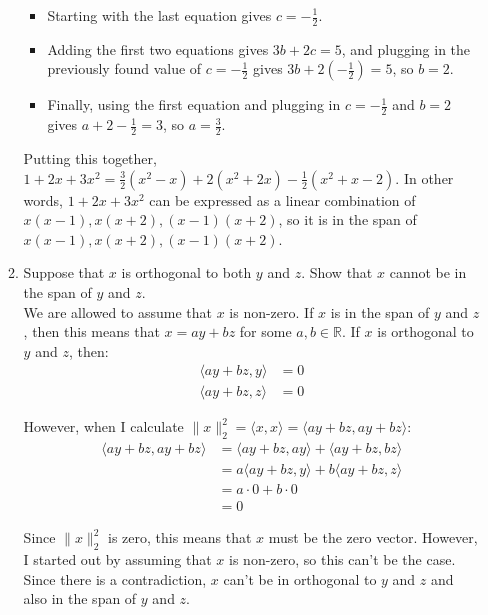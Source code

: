 \documentclass[11pt]{amsart}
\theoremstyle{plain}
\theoremstyle{definition}
\begin{document}
\begin{enumerate}
\begin{enumerate}
\begin{itemize}
	\item Starting with the last equation gives $c = -\frac{1}{2}$.
	\item Adding the first two equations gives $3b + 2c = 5$, and plugging in the previously found value of $c = -\frac{1}{2}$ gives $3b + 2(-\frac{1}{2}) = 5$, so $b = 2$.
	\item Finally, using the first equation and plugging in $c = -\frac{1}{2}$ and $b = 2$ gives $a + 2 - \frac{1}{2} = 3$, so $a = \frac{3}{2}$. 
\end{itemize}
  Putting this together, $1 + 2x + 3x^2 = \frac{3}{2}(x^2 - x) + 2(x^2 + 2x) - \frac{1}{2}(x^2 + x -2)$. In other words, $1 + 2x + 3x^2$ can be expressed as a linear combination of $x(x-1), x(x+2), (x-1)(x+2)$, so it is in the span of $x(x-1), x(x+2), (x-1)(x+2)$. 

\bigskip
\item Suppose that $x$ is orthogonal to both $y$ and $z$. 
Show that $x$ cannot be in the span of $y$ and $z$. \\

We are allowed to assume that $x$ is non-zero. If $x$ is in the span of $y$ and $z$, then this means that $x = ay + bz$ for some $a, b \in \mathbb{R}$. If $x$ is orthogonal to $y$ and $z$, then:
\begin{align} \nonumber
\langle ay+bz, y \rangle &= 0 \\ \nonumber
\langle ay+bz, z \rangle &= 0
\end{align}

However, when I calculate $\|x\|_2^2 = \langle x, x \rangle = \langle ay + bz, ay + bz \rangle$:
\begin{align} \nonumber
\langle ay + bz, ay + bz \rangle &= \langle ay + bz, ay \rangle + \langle ay + bz, bz \rangle \\ \nonumber
                                            &= a \langle ay + bz, y \rangle + b \langle ay + bz, z \rangle \\ \nonumber
                                            &= a \cdot 0 + b \cdot 0 \\ \nonumber
									   &= 0
\end{align}

Since $\|x\|_2^2$ is zero, this means that $x$ must be the zero vector. However, I started out by assuming that $x$ is non-zero, so this can't be the case. Since there is a contradiction, $x$ can't be in orthogonal to $y$ and $z$ and also in the span of $y$ and $z$. 


\end{enumerate}
\end{enumerate}
\end{document}
